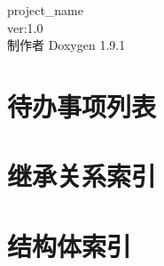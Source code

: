 \let\mypdfximage\pdfximage\def\pdfximage{\immediate\mypdfximage}\documentclass[twoside]{book}
\newcommand{\+}{\discretionary{\mbox{\scriptsize$\hookleftarrow$}}{}{}}
\newcommand{\clearemptydoublepage}{%
  \newpage{\pagestyle{empty}\cleardoublepage}%
}
\begin{document}
\raggedbottom
\begin{CJK}{UTF8}{min}

\hypersetup{pageanchor=false,
             bookmarksnumbered=true,
             pdfencoding=unicode
            }
\begin{titlepage}
\vspace*{7cm}
\begin{center}%
{\Large project\+\_\+name \\[1ex]\large ver\+:1.\+0 }\\
\vspace*{1cm}
{\large 制作者 Doxygen 1.9.1}\\
\end{center}
\end{titlepage}
\clearemptydoublepage
{}
\tableofcontents
\clearemptydoublepage
{}
\hypersetup{pageanchor=true}

\chapter{待办事项列表}
\label{todo}

\chapter{继承关系索引}

\chapter{结构体索引}


\end{CJK}
\end{document}
